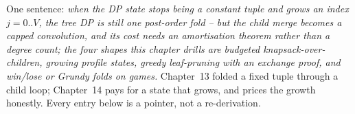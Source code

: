 

One sentence: \emph{when the DP state stops being a constant tuple and grows
an index $j = 0..V$, the tree DP is still one post-order fold -- but the
child merge becomes a capped convolution, and its cost needs an amortisation
theorem rather than a degree count; the four shapes this chapter drills are
budgeted knapsack-over-children, growing profile states, greedy
leaf-pruning with an exchange proof, and win/lose or Grundy folds on
games.} Chapter~13 folded a fixed tuple through a child loop; Chapter~14
pays for a state that grows, and prices the growth honestly. Every entry
below is a pointer, not a re-derivation.

